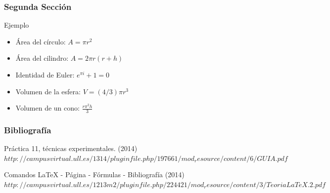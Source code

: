\documentclass{beamer}
\begin{document}
\begin{frame}

\frametitle{Segunda Sección}

\begin{block}{Ejemplo}
  \begin{itemize}
  \item
  Área del círculo:  $A=\pi r^2$
  \pause

  \item
  Área del cilindro: $A=2\pi r(r+h)$
  \pause

  \item
   Identidad de Euler: $e^{\pi i}+1=0$
  \pause

  \item
  Volumen de la esfera: $V=(4/3)\pi r^3$
  \pause

  \item
   Volumen de un cono: $\frac{r\pi^2h}{3}$
  \pause

  \end{itemize}
\end{block}

\end{frame}

\begin{frame}
  \frametitle{Bibliografía}

  \begin{thebibliography}{10}

    \beamertemplatebookbibitems
    Práctica 11, técnicas experimentales. 
    (2014)
    {\small $http://campusvirtual.ull.es/1314/pluginfile.php/197661/mod_resource/content/6/GUIA.pdf$} 

    \beamertemplatebookbibitems
    Comandos LaTeX - Página - Fórmulas - Bibliografía 
    (2014) 
    {\small $http://campusvirtual.ull.es/1213m2/pluginfile.php/224421/mod_resource/content/3/TeoriaLaTeX.2.pdf$}


  \end{thebibliography}
\end{frame}
\end{document}

